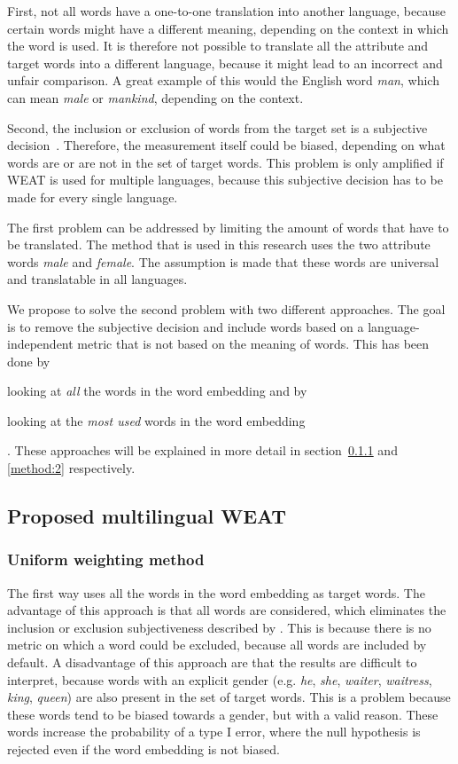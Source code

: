 First, not all words have a one-to-one translation into another
language, because certain words might have a different meaning, depending on the
context in which the word is used. It is therefore not possible to translate all the
attribute and target words into a different language, because it might lead to an
incorrect and unfair comparison. A great example of this would the English word
\textit{man}, which can mean \textit{male} or \textit{mankind}, depending on the context.

Second, the inclusion or exclusion of words from
the target set is a subjective decision~\parencite{nissim_fair_is_better_2020}. Therefore,
the measurement itself could be biased, depending on what words are or are not in the set
of target words. This problem is only amplified if WEAT is used for multiple languages,
because this subjective decision has to be made for every single language.

The first problem can be addressed by limiting the amount of words that have to be
translated. The method that is used in this research uses the two attribute words 
\textit{male} and \textit{female}. The assumption is made that these words are universal
and translatable in all languages. 

We propose to solve the second problem with two different approaches. The goal is to
remove the subjective decision and include words based on a language-independent metric
that is not based on the meaning of words. This has been done by
\begin{enumerate*}[label={(\arabic*)}]
    \item looking at \emph{all} the words in the word embedding and by
    \item looking at the \emph{most used} words in the word embedding
\end{enumerate*}.
These approaches will be explained in more detail in section~\ref{method:1} and
\ref{method:2} respectively.

\subsection{Proposed multilingual WEAT}

\subsubsection{Uniform weighting method}
\label{method:1}
The first way uses
all the words in the word embedding as target words. The advantage of this approach is
that all words are considered, which eliminates the inclusion or exclusion subjectiveness
described by \textcite{nissim_fair_is_better_2020}.  This is because there is no metric
on which a word could be excluded, because all words are included by default.
A disadvantage of this approach
are that the results are difficult to interpret, because words with an explicit
gender (e.g. \textit{he}, \textit{she}, \textit{waiter}, \textit{waitress},
\textit{king}, \textit{queen}) are also
present in the set of target words. This is a problem because these words tend to be biased
towards a gender, but with a valid reason. These words increase the probability of a
type I error, where the null hypothesis is rejected even if the word embedding is not
biased.

